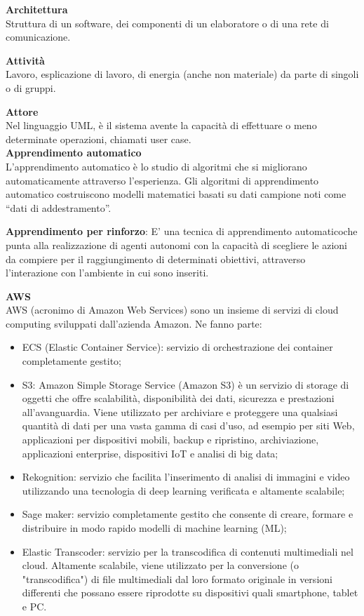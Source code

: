\documentclass[a4paper, oneside, openany, dvipsnames, table, 12pt]{article}
\begin{document}
\textbf{Architettura} \\
Struttura di un software, dei componenti di un elaboratore o di una rete di comunicazione.

\textbf{Attività} \\
Lavoro, esplicazione di lavoro, di energia (anche non materiale) da parte di singoli o di gruppi.

\textbf{Attore} \\
Nel linguaggio UML, è il sistema avente la capacità di effettuare o meno determinate operazioni, chiamati user case. \\

\label{par:appr_auto}
\textbf{Apprendimento automatico} \\ 
L’apprendimento automatico è lo studio di algoritmi che si migliorano automaticamente attraverso l’esperienza. Gli algoritmi di apprendimento automatico costruiscono modelli matematici basati su dati campione noti come “dati di addestramento”.

\textbf{Apprendimento per rinforzo}: 
E’ una tecnica di apprendimento automatico\glo che punta alla realizzazione di agenti autonomi con la capacità di scegliere le azioni da compiere per il raggiungimento di determinati obiettivi, attraverso l’interazione con l’ambiente in cui sono inseriti.	


\textbf{AWS} \\
AWS (acronimo di Amazon Web Services) sono un insieme di servizi di cloud computing sviluppati dall'azienda Amazon. Ne fanno parte: 
\begin{itemize}
\item ECS (Elastic Container Service): servizio di orchestrazione dei container completamente gestito;
\item S3: Amazon Simple Storage Service (Amazon S3) è un servizio di storage di oggetti che offre scalabilità, disponibilità dei dati, sicurezza e prestazioni all'avanguardia. Viene utilizzato per archiviare e proteggere una qualsiasi quantità di dati per una vasta gamma di casi d'uso, ad esempio per siti Web, applicazioni per dispositivi mobili, backup e ripristino, archiviazione, applicazioni enterprise, dispositivi IoT e analisi di big data;
\item Rekognition: servizio che facilita l'inserimento di analisi di immagini e video utilizzando una tecnologia di deep learning verificata e altamente scalabile;
\item Sage maker: servizio completamente gestito che consente di creare, formare e distribuire in modo rapido modelli di machine learning (ML);
\item Elastic Transcoder: servizio per la transcodifica di contenuti multimediali nel cloud. Altamente scalabile, viene utilizzato per la conversione (o "transcodifica") di file multimediali dal loro formato originale in versioni differenti che possano essere riprodotte su dispositivi quali smartphone, tablet e PC.
\end{itemize}
\end{document}
